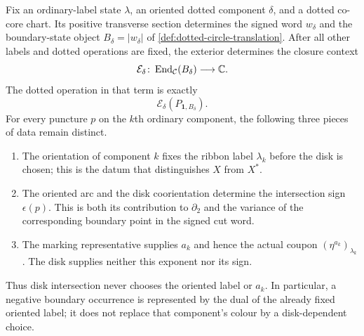 \begin{lemma}
\label{lem:dotted-collar-factorization}
Fix an ordinary-label state $\lambda$, an oriented dotted component $\delta$,
and a dotted co-core chart.  Its positive transverse section determines
the signed word $w_\delta$ and the boundary-state object
$B_\delta=|w_\delta|$ of \cref{def:dotted-circle-translation}.  After all
other labels and dotted operations are fixed, the exterior determines the
closure context
\[
  \mathcal E_\delta\colon
  \operatorname{End}_{\mathcal{C}}(B_\delta)\longrightarrow\mathbb C.
\]
The dotted operation in that term is exactly
\[
  \mathcal E_\delta(P_{\mathbf1,B_\delta}).
  \tag{3.2}\label{eq:typed-dotted-section}
\]
For every puncture $p$ on the $k$th ordinary component, the following three
pieces of data remain distinct.
\begin{enumerate}[label=(\roman*),ref=\roman*]
  \item The orientation of component $k$ fixes the ribbon label
  $\lambda_k$ before the disk is chosen; this is the datum that distinguishes
  $X$ from $X^*$.

  \item The oriented arc and the disk coorientation determine the intersection
  sign $\epsilon(p)$.  This is both its contribution to $\partial_2$ and the
  variance of the corresponding boundary point in the signed cut word.

  \item The marking representative supplies $a_k$ and hence the actual coupon
  $(\eta^{a_k})_{\lambda_k}$.  The disk supplies neither this exponent nor its
  sign.
\end{enumerate}
Thus disk intersection never chooses the oriented label or $a_k$.
In particular, a negative boundary occurrence is represented by the dual of
the already fixed oriented label; it does not replace that component's colour
by a disk-dependent choice.
\end{lemma}

